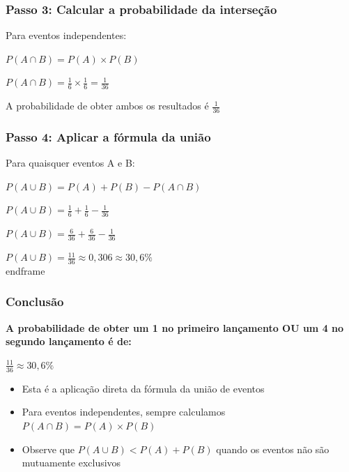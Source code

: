 \documentclass[11pt]{beamer}
\begin{document}
\begin{frame}
\frametitle{Passo 3: Calcular a probabilidade da interseção}
\large
Para eventos independentes:

\vspace{0.5cm}
$P(A \cap B) = P(A) \times P(B)$

\vspace{0.5cm}
$P(A \cap B) = \frac{1}{6} \times \frac{1}{6} = \frac{1}{36}$

\vspace{0.5cm}
\begin{center}
A probabilidade de obter ambos os resultados é $\frac{1}{36}$
\end{center}
\end{frame}

\begin{frame}
\frametitle{Passo 4: Aplicar a fórmula da união}
\large
Para quaisquer eventos A e B:

\vspace{0.3cm}
$P(A \cup B) = P(A) + P(B) - P(A \cap B)$

\vspace{0.5cm}
$P(A \cup B) = \frac{1}{6} + \frac{1}{6} - \frac{1}{36}$

\vspace{0.3cm}
$P(A \cup B) = \frac{6}{36} + \frac{6}{36} - \frac{1}{36}$

\vspace{0.3cm}
$P(A \cup B) = \frac{11}{36} \approx 0,306 \approx 30,6\%$
\\end{frame}

\begin{frame}
\frametitle{Conclusão}
\large
\begin{center}
\textbf{A probabilidade de obter um 1 no primeiro lançamento OU um 4 no segundo lançamento é de:}

\vspace{0.5cm}
$\frac{11}{36} \approx 30,6\%$
\end{center}

\vspace{0.5cm}
\begin{itemize}
\item Esta é a aplicação direta da fórmula da união de eventos
\item Para eventos independentes, sempre calculamos $P(A \cap B) = P(A) \times P(B)$
\item Observe que $P(A \cup B) < P(A) + P(B)$ quando os eventos não são mutuamente exclusivos
\end{itemize}
\end{frame}


\end{frame}
\end{document}

